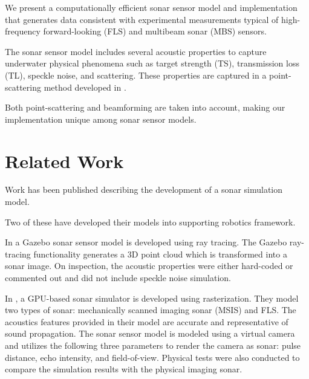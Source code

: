 \documentclass[11pt]{article}
\begin{document}
We present a computationally efficient sonar sensor model and implementation that generates data consistent with experimental measurements typical of high-frequency forward-looking (FLS) and multibeam sonar (MBS) sensors.

The sonar sensor model includes several acoustic properties to capture underwater physical phenomena such as target strength (TS), transmission loss (TL), speckle noise, and scattering. These properties are captured in a point-scattering method developed in \cite{brown17point}.

Both point-scattering and beamforming are taken into account, making our implementation unique among sonar sensor models.

\section{Related Work}
Work has been published describing the development of a sonar simulation model.

Two of these have developed their models into supporting robotics framework.

In \cite{demarco15computationally} a Gazebo sonar sensor model is developed using ray tracing. The Gazebo ray-tracing functionality generates a 3D point cloud which is transformed into a sonar image. On inspection, the acoustic properties were either hard-coded or commented out and did not include speckle noise simulation.

In \cite{cerqueira17novel}, a GPU-based sonar simulator is developed using rasterization. They model two types of sonar: mechanically scanned imaging sonar (MSIS) and FLS. The acoustics features provided in their model are accurate and representative of sound propagation. The sonar sensor model is modeled using a virtual camera and utilizes the following three parameters to render the camera as sonar: pulse distance, echo intensity, and field-of-view. Physical tests were also conducted to compare the simulation results with the physical imaging sonar.
\end{document}
